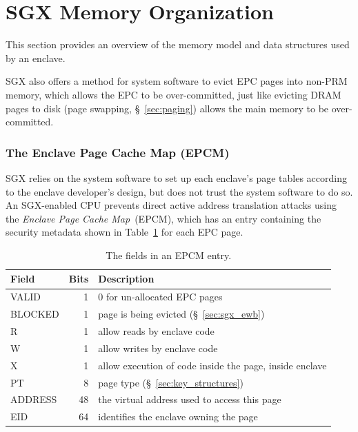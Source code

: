 \section{SGX Memory Organization}
\label{sec:memory}

This section provides an overview of the memory model and  data structures used
by an enclave.


SGX also offers a method for system software to evict EPC pages into non-PRM
memory, which allows the EPC to be over-committed, just like evicting DRAM
pages to disk (page swapping, \S~\ref{sec:paging}) allows the main memory to be
over-committed.


\subsubsection{The Enclave Page Cache Map (EPCM)}


SGX relies on the system software to set up each enclave's page tables
according to the enclave developer's design, but does not trust the system
software to do so. An SGX-enabled CPU prevents direct active address
translation attacks using the \textit{Enclave Page Cache Map}~(EPCM), which has
an entry containing the security metadata shown in
Table~\ref{fig:sgx_epcm_entry}
for each EPC page.



\begin{table}[hbt]
  \centering
  \begin{tabularx}{\columnwidth}{| l | r | X |}
  \hline
  \textbf{Field} & \textbf{Bits} & \textbf{Description}\\
  \hline
  VALID & 1 & 0 for un-allocated EPC pages \\
  \hline
  BLOCKED & 1 & page is being evicted (\S~\ref{sec:sgx_ewb})\\
  \hline
  R & 1 & allow reads by enclave code\\
  \hline
  W & 1 & allow writes by enclave code\\
  \hline
  X & 1 & allow execution of code inside the page, inside enclave\\
  \hline
  PT & 8 & page type (\S~\ref{sec:key_structures})\\
  \hline
  ADDRESS & 48 & the virtual address used to access this page\\
  \hline
  EID & 64 & identifies the enclave owning the page\\
  \hline
  \end{tabularx}
  \caption{
    The fields in an EPCM entry.
  }
  \label{fig:sgx_epcm_entry}
\end{table}

